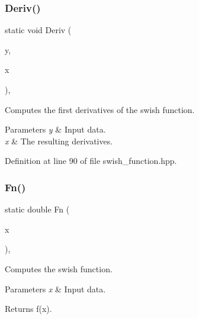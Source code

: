 \subsubsection{Deriv()\hspace{0.1cm}{\footnotesize\ttfamily [2/2]}}
{\footnotesize\ttfamily static void Deriv (\begin{DoxyParamCaption}\item[{const Input\+Vec\+Type \&}]{y,  }\item[{Output\+Vec\+Type \&}]{x }\end{DoxyParamCaption})\hspace{0.3cm}{\ttfamily [inline]}, {\ttfamily [static]}}



Computes the first derivatives of the swish function. 


\begin{DoxyParams}{Parameters}
{\em y} & Input data. \\
\hline
{\em x} & The resulting derivatives. \\
\hline
\end{DoxyParams}


Definition at line 90 of file swish\+\_\+function.\+hpp.

\mbox{\label{classmlpack_1_1ann_1_1SwishFunction_a11bd9a1195e6b107f9fee73643bc328b}} 
\subsubsection{Fn()\hspace{0.1cm}{\footnotesize\ttfamily [1/3]}}
{\footnotesize\ttfamily static double Fn (\begin{DoxyParamCaption}\item[{const double}]{x }\end{DoxyParamCaption})\hspace{0.3cm}{\ttfamily [inline]}, {\ttfamily [static]}}



Computes the swish function. 


\begin{DoxyParams}{Parameters}
{\em x} & Input data. \\
\hline
\end{DoxyParams}
\begin{DoxyReturn}{Returns}
f(x). 
\end{DoxyReturn}


